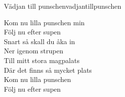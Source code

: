 \begin{song}{Vädjan till punschen}{vadjantillpunschen}
\begin{vers}
Kom nu lilla punschen min\\
Följ nu efter supen\\
Snart så skall du åka in\\
Ner igenom strupen\\
Till mitt stora magpalats\\
Där det finns så mycket plats\\
Kom nu lilla punschen \\
Följ nu efter supen\\
\end{vers}
\end{song}
